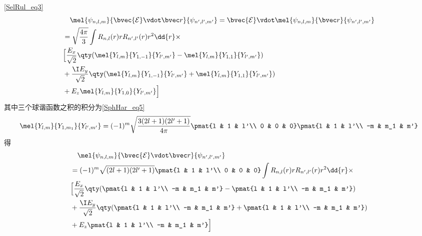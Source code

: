 

\autoref{SelRul_eq3}~
\begin{equation}
\begin{aligned}
&\quad\mel{\psi_{n,l,m}}{\bvec{\mathcal E}\vdot\bvec r}{\psi_{n',l',m'}} = \bvec{\mathcal E}\vdot\mel{\psi_{n,l,m}}{\bvec r}{\psi_{n',l',m'}}\\
&= \sqrt{\frac{4\pi}{3}}\int R_{n,l}(r) r R_{n',l'}(r) r^2 \dd{r}\times\\
&\Big[\frac{E_x}{\sqrt 2} \qty(\mel{Y_{l,m}}{Y_{1,-1}}{Y_{l',m'}} - \mel{Y_{l,m}}{Y_{1,1}}{Y_{l',m'}})\\
&+ \frac{\I E_y}{\sqrt 2} \qty(\mel{Y_{l,m}}{Y_{1,-1}}{Y_{l',m'}} + \mel{Y_{l,m}}{Y_{1,1}}{Y_{l',m'}})\\
&+  E_z \mel{Y_{l,m}}{Y_{1,0}}{Y_{l',m'}}\Big]
\end{aligned}
\end{equation}
其中三个球谐函数之积的积分为\autoref{SphHar_eq5}~
\begin{equation}\label{HDipol_eq1}
\mel{Y_{l,m}}{Y_{1,m_1}}{Y_{l',m'}} = (-1)^m\sqrt{\frac{3(2l+1)(2l'+1)}{4\pi}} \pmat{l & 1 & l'\\ 0 & 0 & 0}\pmat{l & 1 & l'\\ -m & m_1 & m'}
\end{equation}
得
\begin{equation}
\begin{aligned}
&\quad\mel{\psi_{n,l,m}}{\bvec{\mathcal E}\vdot\bvec r}{\psi_{n',l',m'}}\\
&= (-1)^m\sqrt{(2l+1)(2l'+1)} \pmat{l & 1 & l'\\ 0 & 0 & 0} \int R_{n,l}(r) r R_{n',l'}(r) r^2 \dd{r}\times\\
&\Big[\frac{E_x}{\sqrt 2} \qty(\pmat{l & 1 & l'\\ -m & m_1 & m'} - \pmat{l & 1 & l'\\ -m & m_1 & m'})\\
&+ \frac{\I E_y}{\sqrt 2} \qty(\pmat{l & 1 & l'\\ -m & m_1 & m'} + \pmat{l & 1 & l'\\ -m & m_1 & m'})\\
&+  E_z \pmat{l & 1 & l'\\ -m & m_1 & m'}\Big]
\end{aligned}
\end{equation}
